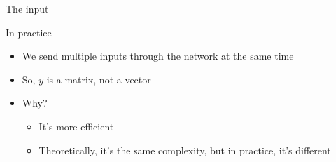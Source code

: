 \documentclass[aspectratio=169]{beamer}
\begin{document}
\begin{frame}{The input}

In practice
\begin{itemize}
        \item We send multiple inputs through the network at the same time
        \item So, $y$ is a matrix, not a vector
        \item Why?
        \begin{itemize}
        		\item It's more efficient
		\item Theoretically, it's the same complexity, but in practice, it's different
	\end{itemize}

\end{itemize}
\end{frame}
%
\end{document}
